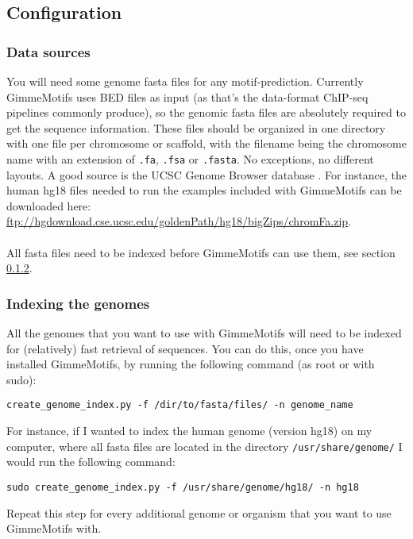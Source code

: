 \documentclass[10pt]{article}
\begin{document}
\subsection{Configuration}
\label{sec:configuration}

\subsubsection{Data sources}
You will need some genome fasta files for any motif-prediction. Currently GimmeMotifs uses BED files as input (as that's the data-format ChIP-seq pipelines commonly produce), so the genomic fasta files are absolutely required to get the sequence information. These files should be organized in one directory with one file per chromosome or scaffold, with the filename being the chromosome name with an extension of \texttt{.fa}, \texttt{.fsa} or \texttt{.fasta}. No exceptions, no different layouts. A good source is the UCSC Genome Browser database \cite{rhead_ucsc_2010}. For instance, the human hg18 files needed to run the examples included with GimmeMotifs can be downloaded here:\\
\url{ftp://hgdownload.cse.ucsc.edu/goldenPath/hg18/bigZips/chromFa.zip}.\\
\\
All fasta files need to be indexed before GimmeMotifs can use them, see section \ref{sec:indexing}.

\subsubsection{Indexing the genomes}
\label{sec:indexing}
All the genomes that you want to use with GimmeMotifs will need to be indexed for (relatively) fast retrieval of sequences. You can do this, once you have installed GimmeMotifs, by running the following command (as root or with sudo):
\begin{verbatim}
create_genome_index.py -f /dir/to/fasta/files/ -n genome_name
\end{verbatim}
For instance, if I wanted to index the human genome (version hg18) on my computer, where all fasta files are located in the directory \texttt{/usr/share/genome/} I would run the following command:
\begin{verbatim}
sudo create_genome_index.py -f /usr/share/genome/hg18/ -n hg18
\end{verbatim}
Repeat this step for every additional genome or organism that you want to use GimmeMotifs with.
\end{document}
